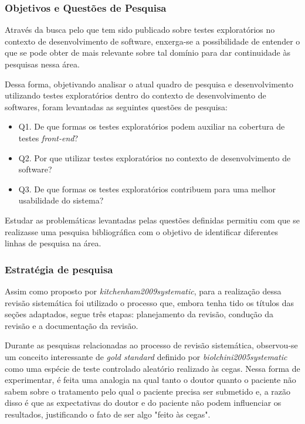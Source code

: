 \subsubsection{Objetivos e Questões de Pesquisa}

\par Através da busca pelo que tem sido publicado sobre testes exploratórios no contexto de desenvolvimento de software, enxerga-se a possibilidade de entender o que se pode obter de mais relevante sobre tal domínio para dar continuidade às pesquisas nessa área.

\par Dessa forma, objetivando analisar o atual quadro de pesquisa e desenvolvimento utilizando testes exploratórios dentro do contexto de desenvolvimento de softwares, foram levantadas as seguintes questões de pesquisa: 

\begin{itemize}
    \item Q1. De que formas os testes exploratórios podem auxiliar na cobertura de testes \textit{front-end}?
    \item Q2. Por que utilizar testes exploratórios no contexto de desenvolvimento de software?
    \item Q3. De que formas os testes exploratórios contribuem para uma melhor usabilidade do sistema?
\end{itemize}

\par Estudar as problemáticas levantadas pelas questões definidas permitiu com que se realizasse uma pesquisa bibliográfica com o objetivo de identificar diferentes linhas de pesquisa na área. 

\subsubsection{Estratégia de pesquisa}

Assim como proposto por \textit{kitchenham2009systematic}, para a realização dessa revisão sistemática foi utilizado o processo que, embora tenha tido os títulos das seções adaptados, segue três etapas: planejamento da revisão, condução da revisão e a documentação da revisão. 

Durante as pesquisas relacionadas ao processo de revisão sistemática, observou-se um conceito interessante de \textit{gold standard} definido por \textit{biolchini2005systematic} como uma espécie de teste controlado aleatório realizado às cegas. Nessa forma de experimentar, é feita uma analogia na qual tanto o doutor quanto o paciente não sabem sobre o tratamento pelo qual o paciente precisa ser submetido e, a razão disso é que as expectativas do doutor e do paciente não podem influenciar os resultados, justificando o fato de ser algo "feito às cegas". 

